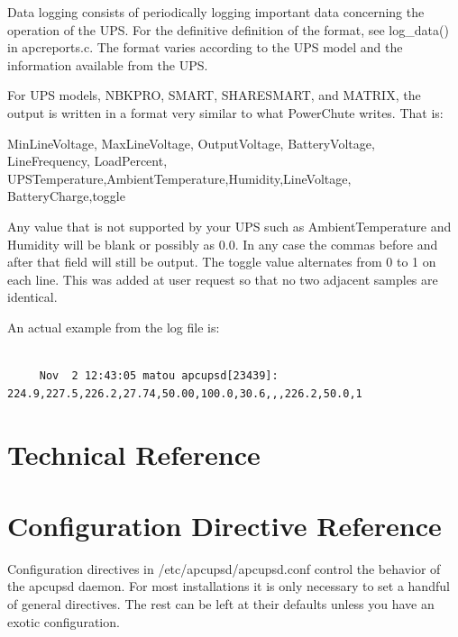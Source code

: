 {{{{{{{{{{Data logging consists of periodically logging important data concerning the
operation of the UPS. For the definitive definition of the format, see
log\_data() in apcreports.c. The format varies according to the UPS model and
the information available from the UPS.  

For UPS models, NBKPRO, SMART, SHARESMART, and MATRIX, the output is written
in a format very similar to what PowerChute writes. That is:  

MinLineVoltage, MaxLineVoltage, OutputVoltage, BatteryVoltage, LineFrequency,
LoadPercent, UPSTemperature,AmbientTemperature,Humidity,LineVoltage,
BatteryCharge,toggle  

Any value that is not supported by your UPS such as AmbientTemperature and
Humidity will be blank or possibly as 0.0. In any case the commas before and
after that field will still be output. The toggle value alternates from 0 to 1
on each line. This was added at user request so that no two adjacent samples
are identical.  

An actual example from the log file is: 

\footnotesize
\begin{verbatim}
     
     Nov  2 12:43:05 matou apcupsd[23439]: 224.9,227.5,226.2,27.74,50.00,100.0,30.6,,,226.2,50.0,1
\end{verbatim}
\normalsize

\label{Technical-Reference}

\section*{Technical Reference}

\label{index-Technical-Reference-235}

\label{Configuration-Directive-Reference}

\section*{Configuration Directive Reference}

\label{index-Reference_002c-Directives-236}
\label{index-Configuration_002c-Directives-237}
\label{index-Directives-238}
Configuration directives in /etc/apcupsd/apcupsd.conf control the behavior of
the apcupsd daemon.  For most installations it is only necessary to set a
handful of general directives. The rest can be left at their defaults unless
you have an exotic configuration. 

}}}}}}}}}}
